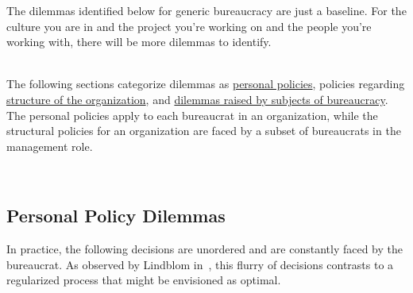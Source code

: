 The dilemmas identified below for generic bureaucracy are just a baseline. For the culture you are in and the project you're working on and the people you're working with, there will be more dilemmas to identify. 

\ \\

The following sections categorize dilemmas as \hyperref[sec:personal-policy-dilemmas]{personal policies}, 
{} 
policies regarding \hyperref[sec:org-dilemma]{structure of the organization},
{} 
and \hyperref[sec:subjects-dilemmas]{dilemmas raised by subjects of bureaucracy}. 
The personal policies apply to each bureaucrat in an organization, while the structural policies for an organization are faced by a subset of bureaucrats in the management role. 



\ \\


\subsection*{Personal Policy Dilemmas \label{sec:personal-policy-dilemmas}}


In practice, the following decisions are unordered and are constantly faced by the bureaucrat. As observed by Lindblom in~\cite{1959_Lindblom}, this flurry of decisions contrasts to a regularized process that might be envisioned as optimal.


